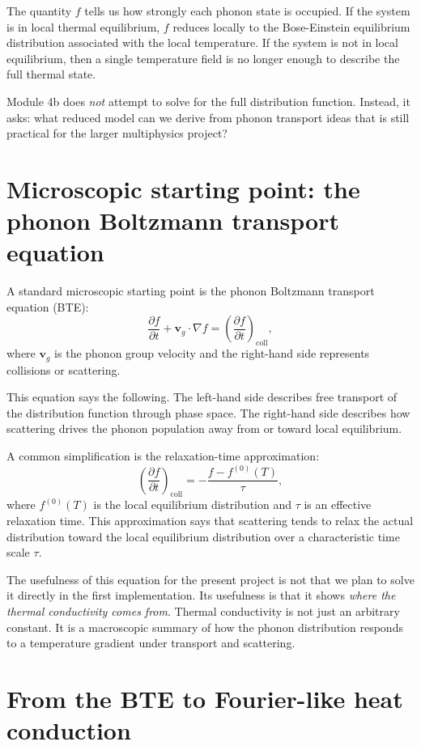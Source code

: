 \documentclass[11pt]{article}
\newcommand{\vvg}{\mathbf{v}_g}
\begin{document}
The quantity $f$ tells us how strongly each phonon state is occupied. If the system is in local thermal equilibrium, $f$ reduces locally to the Bose-Einstein equilibrium distribution associated with the local temperature. If the system is not in local equilibrium, then a single temperature field is no longer enough to describe the full thermal state.

Module 4b does \emph{not} attempt to solve for the full distribution function. Instead, it asks: what reduced model can we derive from phonon transport ideas that is still practical for the larger multiphysics project?

\section{Microscopic starting point: the phonon Boltzmann transport equation}

A standard microscopic starting point is the phonon Boltzmann transport equation (BTE):
\[
\frac{\partial f}{\partial t} + \vvg\cdot \nabla f = \left(\frac{\partial f}{\partial t}\right)_{\!\mathrm{coll}},
\]
where $\vvg$ is the phonon group velocity and the right-hand side represents collisions or scattering.

This equation says the following. The left-hand side describes free transport of the distribution function through phase space. The right-hand side describes how scattering drives the phonon population away from or toward local equilibrium.

A common simplification is the relaxation-time approximation:
\[
\left(\frac{\partial f}{\partial t}\right)_{\!\mathrm{coll}} = -\frac{f-f^{(0)}(T)}{\tau},
\]
where $f^{(0)}(T)$ is the local equilibrium distribution and $\tau$ is an effective relaxation time. This approximation says that scattering tends to relax the actual distribution toward the local equilibrium distribution over a characteristic time scale $\tau$.

The usefulness of this equation for the present project is not that we plan to solve it directly in the first implementation. Its usefulness is that it shows \emph{where the thermal conductivity comes from}. Thermal conductivity is not just an arbitrary constant. It is a macroscopic summary of how the phonon distribution responds to a temperature gradient under transport and scattering.

\section{From the BTE to Fourier-like heat conduction}
\end{document}
